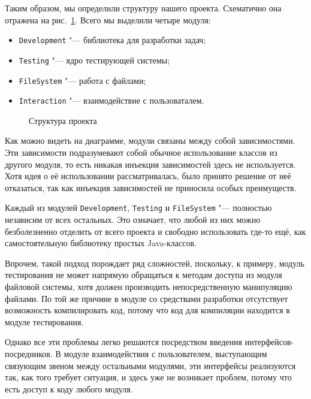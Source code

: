 Таким образом, мы определили структуру нашего проекта. Схематично она отражена на рис.~\ref{package_diagram_main}. Всего мы выделили четыре модуля:

\begin{itemize}
\item \texttt{Development} "--- библиотека для разработки задач;
\item \texttt{Testing} "--- ядро тестирующей системы;
\item \texttt{FileSystem} "--- работа с файлами;
\item \texttt{Interaction} "--- взаимодействие с пользоваталем.
\end{itemize}

\begin{figure}[h]
\caption{Структура проекта}
\label{package_diagram_main}
\end{figure}

Как можно видеть на диаграмме, модули связаны между собой зависимостями. Эти зависимости подразумевают собой обычное использование классов из другого модуля, то есть никакая инъекция зависимостей здесь не используется. Хотя идея о её использовании рассматривалась, было принято решение от неё отказаться, так как инъекция зависимостей не приносила особых преимуществ.

Каждый из модулей \texttt{Development}, \texttt{Testing} и \texttt{FileSystem} "--- полностью независим от всех остальных. Это означает, что любой из них можно безболезненно отделить от всего проекта и свободно использовать где-то ещё, как самостоятельную библиотеку простых Java-классов.

Впрочем, такой подход порождает ряд сложностей, поскольку, к примеру, модуль тестирования не может напрямую обращаться к методам доступа из модуля файловой системы, хотя должен производить непосредственную манипуляцию файлами. По той же причине в модуле со средствами разработки отсутствует возможность компилировать код, потому что код для компиляции находится в модуле тестирования.

Однако все эти проблемы легко решаются посредством введения интерфейсов-посредников. В модуле взаимодействия с пользователем, выступающим связующим звеном между остальными модулями, эти интерфейсы реализуются так, как того требует ситуация, и здесь уже не возникает проблем, потому что есть доступ к коду любого модуля.